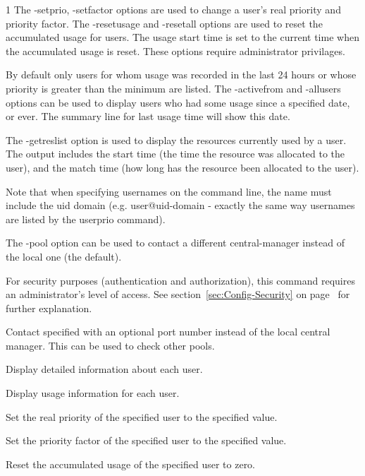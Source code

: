 \begin{ManPage}{\label{man-condor-userprio}}{1}
The -setprio, -setfactor options are used to change a user's real priority and priority factor.
The -resetusage and -resetall options are used to reset the accumulated usage for users. The
usage start time is set to the current time when the accumulated usage is reset. These
options require administrator privilages.

By default only users for whom usage was recorded in the last 24 hours or whose priority is
greater than the minimum are listed. The -activefrom and -allusers options can be used
to display users who had some usage since a specified date, or ever. The summary line for 
last usage time will show this date.

The -getreslist option is used to display the resources currently used by a user. The
output includes the start time (the time the resource was allocated to the user), and
the match time (how long has the resource been allocated to the user).

Note that when specifying usernames on the command line, the name must include the
uid domain (e.g. user@uid-domain - exactly the same way usernames are listed by the
userprio command).

The -pool option can be used to contact a different central-manager instead of
the local one (the default).

For security purposes (authentication and authorization),
this command requires an administrator's level of access.
See
section~\ref{sec:Config-Security} on page~\pageref{sec:Config-Security}
for further explanation.

\begin{Options}

	{Contact specified  with an optional
	port number instead of the local central manager. This
can be used to check other pools.}

	{Display detailed information about each user.}

	{Display usage information for each user.}

	{Set the real priority of the specified user to the specified value.}

	{Set the priority factor of the specified user to the specified value.}

	{Reset the accumulated usage of the specified user to zero.}


\end{Options}
\end{ManPage}

